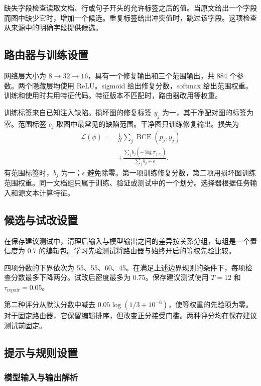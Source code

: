 缺失字段检查读取文档、行或句子开头的允许标签之后的值。当原文给出一个字段而图中缺少它时，增加一个候选。重复标签给出冲突值时，跳过该字段。这项检查从来源中的明确字段提供候选。

\subsection{路由器与训练设置}

网络层大小为 $8\!\rightarrow\!32\!\rightarrow\!16$，具有一个修复输出和三个范围输出，共 884 个参数。两个隐藏层均使用 ReLU。sigmoid 给出修复分数，softmax 给出范围权重。训练和使用时共用特征代码。特征版本不匹配时，路由器改用等权重。

训练标签来自已知注入缺陷。损坏图的修复标签 $y_j$ 为一，其干净配对图的标签为零。范围标签 $c_j$ 取图中最常见的缺陷范围。干净图只训练修复输出。损失为
\begin{equation}
\label{eq:decision_loss}
\begin{split}
\mathcal L(\phi)={}&\frac1N\sum_j\operatorname{BCE}(p_j,y_j)\\
&+\frac{\sum_j b_j(-\log\pi_{j,c_j})}{\sum_j b_j+\epsilon}.
\end{split}
\end{equation}
有范围标签时，$b_j$ 为一；$\epsilon$ 避免除零。第一项训练修复分数，第二项用损坏图训练范围权重。同一文档组只属于训练、验证或测试中的一个划分。选择器根据任务输入和源文本计算特征。

\subsection{候选与试改设置}

在保存建议测试中，清理后输入与模型输出之间的差异按关系分组，每组是一个置信度为 0.7 的编辑包。学习先验测试将路由器与始终开启的等权先验比较。

四项分数的下界依次为 55、55、60、45。在满足上述边界规则的条件下，每项检查分数最多下降两分。试改后密度最多为 0.75。保存建议测试使用 $T=12$ 和 $\tau_{\mathrm{repair}}=0.05$。

第二种评分从默认分数中减去 $0.05\log(1/3+10^{-6})$，使等权重的先验项为零。对于固定路由器，它保留编辑排序，但改变正分接受门槛。两种评分均在保存建议测试前固定。

\subsection{提示与规则设置}
\label{sec:impl:enhancement}

\subsubsection{模型输入与输出解析}
\label{sec:impl:assessment}

